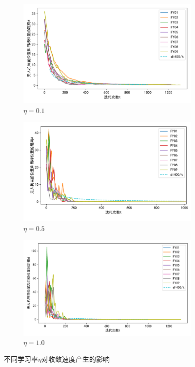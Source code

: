 \documentclass[withoutpreface,bwprint]{cumcmthesis} %
\begin{document}
\begin{figure}[H]
    \centering
    \begin{subfigure}{0.7\linewidth}
        \includegraphics[width=1\linewidth]{figures/c9_lr0-1_conv.pdf}
        \caption{$\eta=0.1$}
    \end{subfigure}
    \begin{subfigure}{0.7\linewidth}
        \includegraphics[width=1\linewidth]{figures/c9_noisy1_conv.pdf}
        \caption{$\eta=0.5$}
    \end{subfigure}
    \begin{subfigure}{0.7\linewidth}
        \includegraphics[width=1\linewidth]{figures/c9_lr1-0_conv.pdf}
        \caption{$\eta=1.0$}
    \end{subfigure}
    \caption{不同学习率$\eta$对收敛速度产生的影响}
    \label{fig:Diff_eta_conv}
\end{figure}
\end{document}
